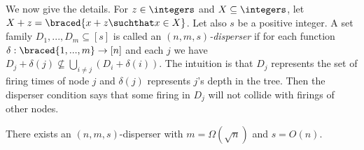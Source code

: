 We now give the details. For $z\in\integers$ and $X\subseteq\integers$, let
$X+z = \braced{x+z\suchthat x\in X}$. Let also $s$ be a positive integer.
A set family $D_1,...,D_m \subseteq [s]$ is called an \emph{$(n,m,s)$-disperser} if 
for each function $\delta: \braced{1,...,m}\to [n]$ and
each $j$ we have $D_j + \delta(j) \not\subseteq \bigcup_{i\neq j} (D_i + \delta(i))$.
The intuition is that $D_j$ represents the set of firing times of node $j$ and
 $\delta(j)$ represents $j$'s depth in the tree.
Then the disperser condition says that some firing in $D_j$ will not collide
with firings of other nodes.




\begin{lemma}\label{lem: disperser}
There exists an $(n,m,s)$-disperser with $m = \Omega(\sqrt{n})$ and $s = O(n)$.
\end{lemma}

